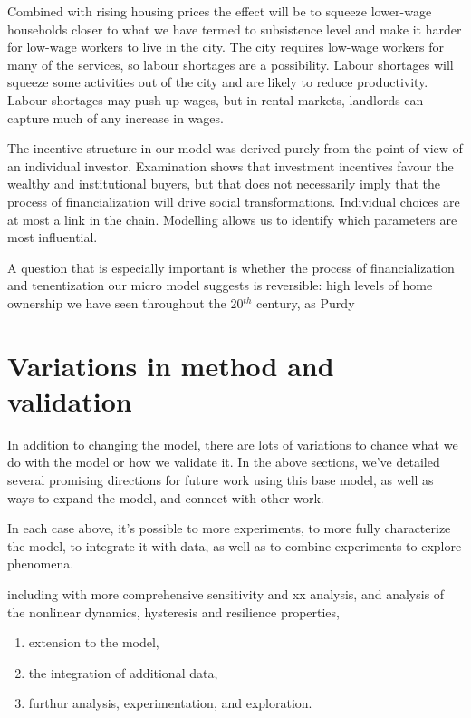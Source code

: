 Combined with rising housing prices the effect will be to squeeze lower-wage households closer to what we have termed to subsistence level and make it harder for low-wage workers to live in the city. The city requires low-wage workers for many of the services, so labour shortages are a possibility. Labour shortages will squeeze some activities out of the city and are likely to reduce productivity. Labour shortages may push up wages, but in rental markets, landlords can capture much of any increase in wages. 

The incentive structure in our model was derived purely from the point of view of an individual investor. Examination shows that investment incentives favour the wealthy and institutional buyers, but that does not necessarily imply that the process of financialization will drive social transformations. Individual choices are at most  a link in the chain. Modelling  allows us to identify which parameters are most influential. 

A question that is especially important is whether the process of financialization and tenentization our micro model suggests is reversible:  high levels of home ownership we have seen throughout the 20$^{th}$ century, as Purdy 

\section{Variations in method and validation}

In addition to changing the model, there are lots of variations to chance what we do with the model or how we validate it. In the above sections, we've detailed several promising directions for future work using this base model, as well as ways to expand the model, and connect with other work. 

In each case above,  it's possible to more experiments, to more fully characterize the model, to integrate it with data, as well as to combine experiments to explore phenomena. 

including with more comprehensive sensitivity and xx analysis, and analysis of the nonlinear dynamics, hysteresis and resilience properties, 


\begin{enumerate}
    \item extension to the model, 
    \item the integration of additional data, 
    \item furthur analysis, experimentation, and exploration.
\end{enumerate}


